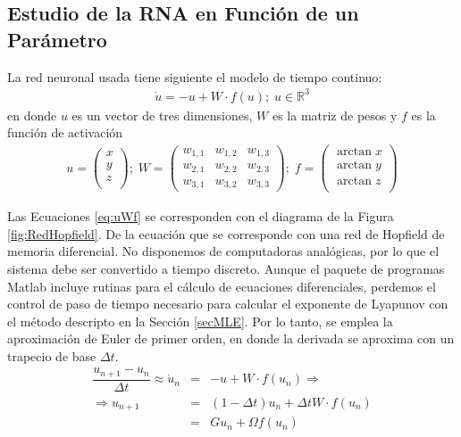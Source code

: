 \subsection{Estudio de la RNA en Función de un Parámetro}

La red neuronal usada tiene siguiente el modelo de tiempo continuo:
\begin{eqnarray}\label{eq:ModTiempCont}
\dot{u} = -u + W \cdot f(u); \; u \in \mathbb{R}^3
\end{eqnarray}
en donde $u$ es un vector de tres dimensiones, $W$ es la matriz de pesos y $f$ es la función de activación
\begin{eqnarray}\label{eq:uWf}
u =
\left( \begin{array}{c}
x\\
y\\
z\\
\end{array} \right)
; \;
W =
\left( \begin{array}{ccc}
w_{1,1} & w_{1,2} & w_{1,3}\\
w_{2,1} & w_{2,2} & w_{2,3}\\
w_{3,1} & w_{3,2} & w_{3,3}
\end{array} \right)
; \;
f =
\left( \begin{array}{c}
\arctan x\\
\arctan y\\
\arctan z\\
\end{array} \right)
\end{eqnarray}

Las Ecuaciones \ref{eq:uWf} se corresponden con el diagrama de la Figura \ref{fig:RedHopfield}.
De la ecuación que se corresponde con una red de Hopfield de memoria diferencial.
No disponemos de computadoras analógicas, por lo que el sistema debe ser convertido a tiempo discreto.
Aunque el paquete de programas Matlab incluye rutinas para el cálculo de ecuaciones diferenciales, perdemos el control de paso de tiempo necesario para calcular el exponente de Lyapunov con el método descripto en la Sección \ref{secMLE}.
Por lo tanto, se emplea la aproximación de Euler de primer orden, en donde la derivada se aproxima con un trapecio de base $\Delta t$.
%
\begin{eqnarray}\label{eq:EulerRNA}
	\dfrac{u_{n+1}-u_n}{\Delta t} \approx \dot{u}_n &=& -u + W \cdot f(u_n) \Rightarrow\\ \nonumber
	\Rightarrow u_{n+1} &=& (1 - \Delta t)u_n + \Delta t W \cdot f(u_n)\\ \nonumber
						 &=& Gu_n + \Omega f(u_n)
\end{eqnarray}

